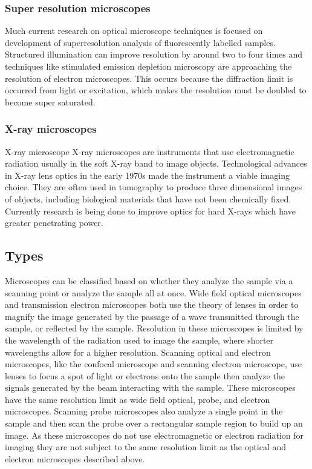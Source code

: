 \documentclass[12pt]{article}
\begin{document}
\subsubsection{Super resolution microscopes}
Much current research on optical microscope techniques is focused on development of superresolution analysis of fluorescently labelled samples.
Structured illumination can improve resolution by around two to four times and techniques like stimulated emission depletion microscopy are approaching the resolution of electron microscopes.
This occurs because the diffraction limit is occurred from light or excitation, which makes the resolution must be doubled to become super saturated.

\subsubsection{X-ray microscopes}
 X-ray microscope X-ray microscopes are instruments that use electromagnetic radiation usually in the soft X-ray band to image objects.
Technological advances in X-ray lens optics in the early 1970s made the instrument a viable imaging choice.
They are often used in tomography to produce three dimensional images of objects, including biological materials that have not been chemically fixed.
Currently research is being done to improve optics for hard X-rays which have greater penetrating power.

\subsection{Types}
Microscopes can be classified based on whether they analyze the sample via a scanning point or analyze the sample all at once.
Wide field optical microscopes and transmission electron microscopes both use the theory of lenses in order to magnify the image generated by the passage of a wave transmitted through the sample, or reflected by the sample.
Resolution in these microscopes is limited by the wavelength of the radiation used to image the sample, where shorter wavelengths allow for a higher resolution.
Scanning optical and electron microscopes, like the confocal microscope and scanning electron microscope, use lenses to focus a spot of light or electrons onto the sample then analyze the signals generated by the beam interacting with the sample.
These microscopes have the same resolution limit as wide field optical, probe, and electron microscopes.
Scanning probe microscopes also analyze a single point in the sample and then scan the probe over a rectangular sample region to build up an image.
As these microscopes do not use electromagnetic or electron radiation for imaging they are not subject to the same resolution limit as the optical and electron microscopes described above.
\end{document}
